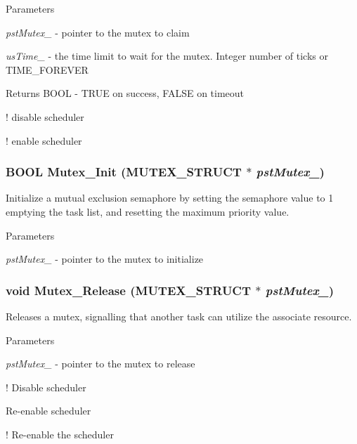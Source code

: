 \begin{DoxyParams}{Parameters}
\item[{\em pstMutex\_\-}]-\/ pointer to the mutex to claim \item[{\em usTime\_\-}]-\/ the time limit to wait for the mutex. Integer number of ticks or TIME\_\-FOREVER \end{DoxyParams}
\begin{DoxyReturn}{Returns}
BOOL -\/ TRUE on success, FALSE on timeout 
\end{DoxyReturn}


! disable scheduler

! enable scheduler 
\subsubsection[{Mutex\_\-Init}]{\setlength{\rightskip}{0pt plus 5cm}BOOL Mutex\_\-Init ({\bf MUTEX\_\-STRUCT} $\ast$ {\em pstMutex\_\-})}\label{mutex_8c_a5ac0cd5727ec369381ca113e52bc594a}
Initialize a mutual exclusion semaphore by setting the semaphore value to 1 emptying the task list, and resetting the maximum priority value.


\begin{DoxyParams}{Parameters}
\item[{\em pstMutex\_\-}]-\/ pointer to the mutex to initialize \end{DoxyParams}
\subsubsection[{Mutex\_\-Release}]{\setlength{\rightskip}{0pt plus 5cm}void Mutex\_\-Release ({\bf MUTEX\_\-STRUCT} $\ast$ {\em pstMutex\_\-})}\label{mutex_8c_ad0715c4836a6335db7520189b1f64348}
Releases a mutex, signalling that another task can utilize the associate resource.


\begin{DoxyParams}{Parameters}
\item[{\em pstMutex\_\-}]-\/ pointer to the mutex to release \end{DoxyParams}


! Disable scheduler

Re-\/enable scheduler

! Re-\/enable the scheduler 